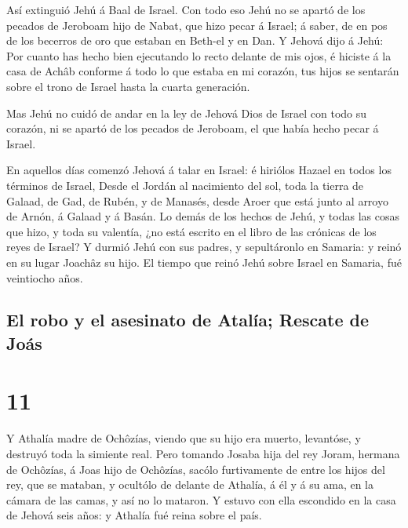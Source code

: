  Así extinguió Jehú á Baal de Israel.  Con
todo eso Jehú no se apartó de los pecados de Jeroboam hijo de Nabat, que
hizo pecar á Israel; á saber, de en pos de los becerros de oro que
estaban en Beth-el y en Dan.  Y Jehová dijo á Jehú: Por
cuanto has hecho bien ejecutando lo recto delante de mis ojos, é hiciste
á la casa de Achâb conforme á todo lo que estaba en mi corazón, tus
hijos se sentarán sobre el trono de Israel hasta la cuarta generación.

 Mas Jehú no cuidó de andar en la ley de Jehová Dios de
Israel con todo su corazón, ni se apartó de los pecados de Jeroboam, el
que había hecho pecar á Israel.

 En aquellos días comenzó Jehová á talar en Israel: é
hiriólos Hazael en todos los términos de Israel,  Desde
el Jordán al nacimiento del sol, toda la tierra de Galaad, de Gad, de
Rubén, y de Manasés, desde Aroer que está junto al arroyo de Arnón, á
Galaad y á Basán.  Lo demás de los hechos de Jehú, y
todas las cosas que hizo, y toda su valentía, ¿no está escrito en el
libro de las crónicas de los reyes de Israel?  Y durmió
Jehú con sus padres, y sepultáronlo en Samaria: y reinó en su lugar
Joachâz su hijo.  El tiempo que reinó Jehú sobre Israel
en Samaria, fué veintiocho años.

\hypertarget{el-robo-y-el-asesinato-de-ataluxeda-rescate-de-jouxe1s}{%
\subsection{El robo y el asesinato de Atalía; Rescate de
Joás}\label{el-robo-y-el-asesinato-de-ataluxeda-rescate-de-jouxe1s}}

\hypertarget{section-12-11}{%
\section{11}\label{section-12-11}}

 Y Athalía madre de Ochôzías, viendo que su hijo era
muerto, levantóse, y destruyó toda la simiente real.  Pero
tomando Josaba hija del rey Joram, hermana de Ochôzías, á Joas hijo de
Ochôzías, sacólo furtivamente de entre los hijos del rey, que se
mataban, y ocultólo de delante de Athalía, á él y á su ama, en la cámara
de las camas, y así no lo mataron.  Y estuvo con ella
escondido en la casa de Jehová seis años: y Athalía fué reina sobre el
país.


